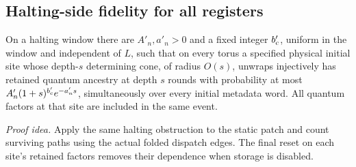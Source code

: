 \subsection{Halting-side fidelity for all registers}\label{f4:forgetting}
\begin{lemma}\label{f4:ancestor}
On a halting window there are \(A'_n,a'_n>0\) and a fixed integer
\(b'_{\rm c}\), uniform in the window and independent of \(L\), such
that on every torus a specified physical initial site whose
depth-\(s\) determining cone, of radius \(O(s)\), unwraps injectively
has retained quantum ancestry at depth \(s\) rounds with probability at
most \(A'_n(1+s)^{b'_{\rm c}}e^{-a'_ns}\), simultaneously over every
initial metadata word. All quantum
factors at that site are included in the same event.
\end{lemma}
\par\noindent\emph{Proof idea.} Apply the same halting obstruction to the static patch and count surviving paths using the actual folded dispatch edges. The final reset on each site's retained factors removes their dependence when storage is disabled.

